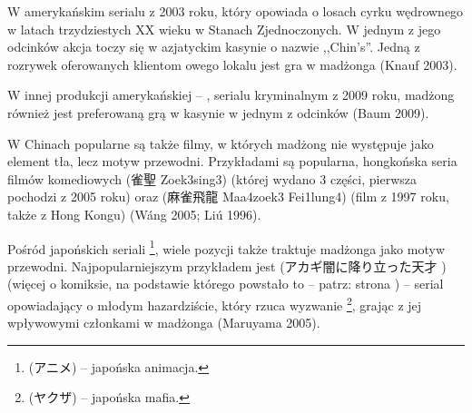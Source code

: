 W amerykańskim serialu  z 2003 roku, który
opowiada o losach cyrku wędrownego w latach trzydziestych XX wieku w Stanach
Zjednoczonych. W jednym z jego odcinków akcja toczy się w azjatyckim kasynie o
nazwie ,,Chin's''. Jedną z rozrywek oferowanych klientom owego lokalu jest gra w
madżonga (Knauf 2003).

W innej produkcji amerykańskiej -- , serialu kryminalnym z 2009
roku, madżong również jest preferowaną grą w kasynie w jednym z odcinków (Baum
2009).

W Chinach popularne są także filmy, w których madżong nie
występuje jako element tła, lecz motyw przewodni. Przykładami są popularna,
hongkońska seria filmów komediowych  (雀聖 Zoek3sing3)
(której wydano 3 części, pierwsza pochodzi z 2005 roku) oraz  (麻雀飛龍 Maa4zoek3 Fei1lung4) (film z 1997 roku, także z Hong Kongu)
(Wáng 2005; Liú 1996).

Pośród japońskich seriali \footnote{ (アニメ) --
japońska animacja.}, wiele pozycji także traktuje madżonga jako motyw przewodni.
Najpopularniejszym przykładem jest  (アカギ闇に降り立った天才   
 ) (więcej o komiksie, na podstawie którego
powstało to  -- patrz: strona \pageref{washizu}) -- serial
opowiadający o młodym hazardziście, który rzuca wyzwanie
\footnote{ (ヤクザ) -- japońska mafia.}, grając z
jej wpływowymi członkami w madżonga (Maruyama 2005).










 















